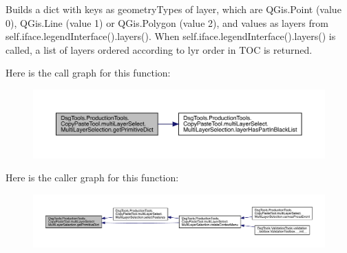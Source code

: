 \begin{DoxyVerb}Builds a dict with keys as geometryTypes of layer, which are QGis.Point (value 0), QGis.Line (value 1) or QGis.Polygon (value 2),
and values as layers from self.iface.legendInterface().layers(). When self.iface.legendInterface().layers() is called, a list of
layers ordered according to lyr order in TOC is returned.
\end{DoxyVerb}
 Here is the call graph for this function\+:
\nopagebreak
\begin{figure}[H]
\begin{center}
\leavevmode
\includegraphics[width=350pt]{class_dsg_tools_1_1_production_tools_1_1_copy_paste_tool_1_1multi_layer_select_1_1_multi_layer_selection_ae6eafe6bd1b2ee8c71bd043da057be57_cgraph}
\end{center}
\end{figure}
Here is the caller graph for this function\+:
\nopagebreak
\begin{figure}[H]
\begin{center}
\leavevmode
\includegraphics[width=350pt]{class_dsg_tools_1_1_production_tools_1_1_copy_paste_tool_1_1multi_layer_select_1_1_multi_layer_selection_ae6eafe6bd1b2ee8c71bd043da057be57_icgraph}
\end{center}
\end{figure}
\mbox{\label{class_dsg_tools_1_1_production_tools_1_1_copy_paste_tool_1_1multi_layer_select_1_1_multi_layer_selection_a70d66faf08affdbc098675d3226aed5b}} 

